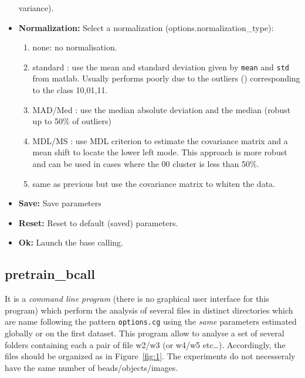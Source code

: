 \documentclass{scrartcl}
\begin{document}
\begin{itemize}
  variance).
\item \textbf{Normalization:} Select a normalization
  (options.normalization\_type):
\begin{enumerate}
\item none: no normalisation.
\item standard : use the mean and standard deviation given by
  \texttt{mean} and \texttt{std} from matlab. Usually performs poorly
  due to the outliers (\cite{outliers}) corresponding to the class 10,01,11.
\item MAD/Med : use the median absolute deviation \cite{mad} and the median
  (robust up to 50\% of outliers) 
\item MDL/MS : use MDL criterion to estimate the covariance matrix and
  a mean shift to locate the lower left mode. This approach is more
  robust and can be used in cases where the 00 cluster is less than
  50\%.
\item same as previous but use the covariance matrix to whiten the data.
\end{enumerate}
\item \textbf{Save:} Save parameters
\item \textbf{Reset:} Reset to default (saved) parameters.
\item \textbf{Ok:} Launch the base calling.
\end{itemize}

\subsection{pretrain\_bcall}
It is a \emph{command line program} (there is no graphical user
interface for this program) which perform the analysis of several
files in distinct directories which are name following the pattern
\texttt{options.cg} using the \emph{same} parameters estimated globally or on
the first dataset. This program allow to analyse a set of several
folders containing each a pair of file w2/w3 (or w4/w5
etc\dots). Accordingly, the files should be organized as in
Figure~\ref{fig:1}. The experiments do not necesseraly have the same
number of beads/objects/images.
\end{document}
